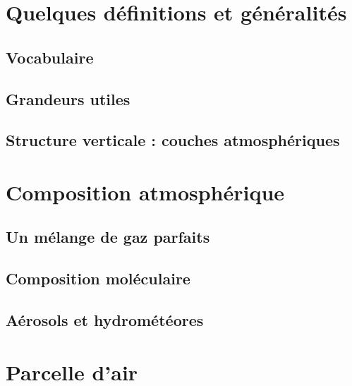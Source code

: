 \documentclass[a4paper,DIV16,10pt]{scrartcl}
\begin{document}
 \inidoc

\newpage 

\mk \section{Quelques définitions et généralités}

	\sk \subsection{Vocabulaire}
	

	\sk \subsection{Grandeurs utiles}
	
	

	\sk \subsection{Structure verticale : couches atmosphériques}
	
	

\mk \section{Composition atmosphérique}
	
	\sk \subsection{Un mélange de gaz parfaits}
	

	\sk \subsection{Composition moléculaire}
	
	
	
	

	\sk \subsection{Aérosols et hydrométéores}
	

\mk \section{Parcelle d'air}
\end{document}
